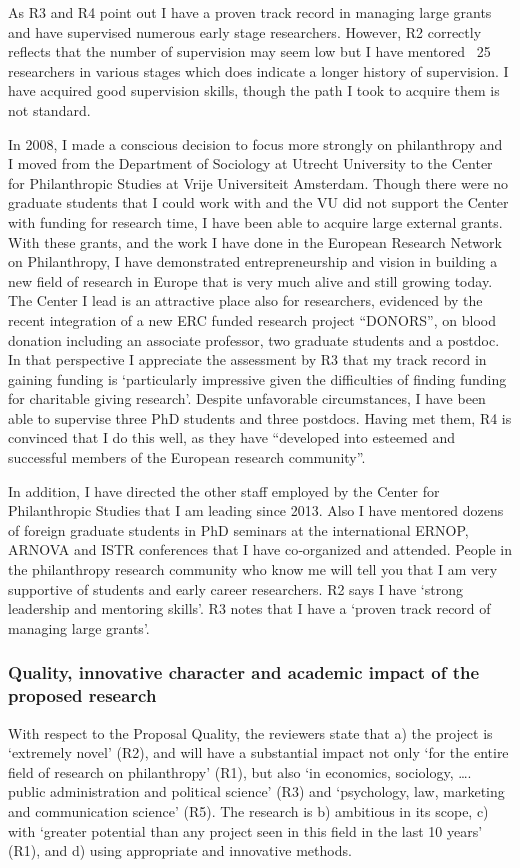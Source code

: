 \documentclass[twocolumn, serif, rga, numeric]{jote-article}
\begin{document}
As R3 and R4 point out I have a proven track record in managing large grants and have supervised numerous early stage researchers. However, R2 correctly reflects that the number of supervision may seem low but I have mentored ~25 researchers in various stages which does indicate a longer history of supervision. I have acquired good supervision skills, though the path I took to acquire them is not standard.

In 2008, I made a conscious decision to focus more strongly on philanthropy and I moved from the Department of Sociology at Utrecht University to the Center for Philanthropic Studies at Vrije Universiteit Amsterdam. Though there were no graduate students that I could work with and the VU did not support the Center with funding for research time, I have been able to acquire large external grants. With these grants, and the work I have done in the European Research Network on Philanthropy, I have demonstrated entrepreneurship and vision in building a new field of research in Europe that is very much alive and still growing today. The Center I lead is an attractive place also for researchers, evidenced by the recent integration of a new ERC funded research project “DONORS”, on blood donation including an associate professor, two graduate students and a postdoc.
In that perspective I appreciate the assessment by R3 that my track record in gaining funding is ‘particularly impressive given the difficulties of finding funding for charitable giving research’. Despite unfavorable circumstances, I have been able to supervise three PhD students and three postdocs. Having met them, R4 is convinced that I do this well, as they have “developed into esteemed and successful members of the European research community”.

In addition, I have directed the other staff employed by the Center for Philanthropic Studies that I am leading since 2013. Also I have mentored dozens of foreign graduate students in PhD seminars at the international ERNOP, ARNOVA and ISTR conferences that I have co‐organized and attended. People in the philanthropy research community who know me will tell you that I am very supportive of students and early career researchers. R2 says I have ‘strong leadership and mentoring skills’. R3 notes that I have a ‘proven track record of managing large grants’.
 {}\subsubsection*{Quality, innovative character and academic impact of the proposed research} 
With respect to the Proposal Quality, the reviewers state that a) the project is ‘extremely novel’ (R2), and will have a substantial impact not only ‘for the entire field of research on philanthropy’ (R1), but also ‘in economics, sociology, …. public administration and political science’ (R3) and ‘psychology, law, marketing and communication science’ (R5). The research is b) ambitious in its scope, c) with ‘greater potential than any project seen in this field in the last 10 years’ (R1), and d) using appropriate and innovative methods.
\end{document}
